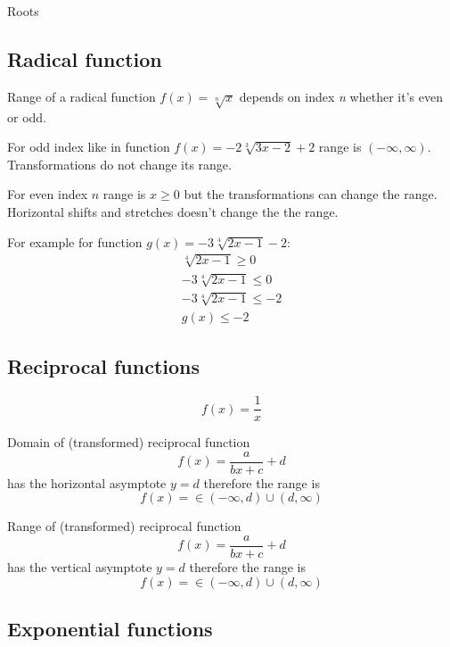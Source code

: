 \documentclass{article}
\begin{document}
Roots


\subsection{Radical function}
Range of a radical function $f(x) = \sqrt[n]{x}$ depends on index \textit{n} whether it's even or odd.

For odd index like in function $f(x) = -2\sqrt[3]{3x-2}+2$ range is $(-\infty, \infty)$.
Transformations do not change its range.

For even index $n$ range is $x \geqslant 0$ but the transformations can change the range.
Horizontal shifts and stretches doesn't change the the range.

For example for function $g(x) = -3\sqrt[4]{2x-1}-2$:
\begin{equation}
  \begin{gathered}
  \sqrt[4]{2x-1} \geqslant 0 \\
  -3\sqrt[4]{2x-1} \leqslant 0 \\
  -3\sqrt[4]{2x-1} \leqslant -2 \\
  g(x) \leqslant -2
  \end{gathered}
\end{equation}

\subsection{Reciprocal functions}
\begin{equation}
  f(x) = \frac{1}{x}
\end{equation}

Domain of (transformed) reciprocal function
\begin{equation}
f(x) = \frac{a}{bx+c} + d
\end{equation}
has the horizontal asymptote $y = d$ therefore the range is
\begin{equation}
f(x) = \in (-\infty, d) \cup (d, \infty)
\end{equation}

Range of (transformed) reciprocal function
\begin{equation}
f(x) = \frac{a}{bx+c} + d
\end{equation}
has the vertical asymptote $y = d$ therefore the range is
\begin{equation}
f(x) = \in (-\infty, d) \cup (d, \infty)
\end{equation}


\subsection{Exponential functions}
\end{document}
